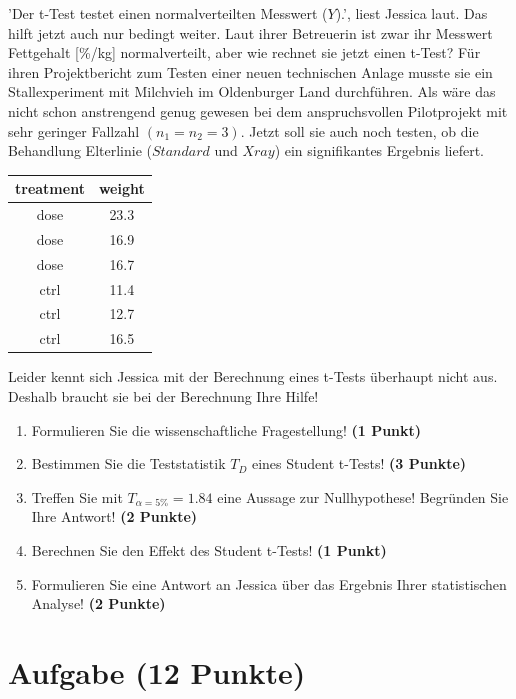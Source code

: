 \documentclass[a4paper, 9pt]{scrartcl}\usepackage[]{graphicx}\usepackage[]{xcolor}
\begin{document}
'Der t-Test testet einen normalverteilten Messwert ($Y$).', liest Jessica laut. Das hilft jetzt auch nur bedingt weiter. Laut ihrer Betreuerin ist zwar ihr Messwert Fettgehalt [\%/kg] normalverteilt, aber wie rechnet sie jetzt einen t-Test? Für ihren Projektbericht zum Testen einer neuen technischen Anlage musste sie ein Stallexperiment mit Milchvieh im Oldenburger Land durchführen. Als wäre das nicht schon anstrengend genug gewesen bei dem anspruchsvollen Pilotprojekt mit sehr geringer Fallzahl $(n_1 = n_2 = 3)$. Jetzt soll sie auch noch testen, ob die Behandlung Elterlinie ($Standard$ und $Xray$) ein signifikantes Ergebnis liefert.

\begin{table}[!h]
\centering
\begin{tabular}{cc}
\toprule
treatment & weight\\
\midrule
dose & 23.3\\
dose & 16.9\\
dose & 16.7\\
ctrl & 11.4\\
ctrl & 12.7\\
\addlinespace
ctrl & 16.5\\
\bottomrule
\end{tabular}
\end{table}



Leider kennt sich Jessica mit der Berechnung eines t-Tests überhaupt nicht aus. Deshalb braucht sie bei der Berechnung Ihre Hilfe!

\begin{enumerate}
  \item Formulieren Sie die wissenschaftliche Fragestellung! \textbf{(1 Punkt)}
  \item Bestimmen Sie die Teststatistik $T_{D}$ eines Student t-Tests! \textbf{(3 Punkte)}
  \item Treffen Sie mit $T_{\alpha = 5\%} = 1.84$ eine Aussage zur Nullhypothese! Begründen Sie Ihre Antwort! \textbf{(2 Punkte)}
  \item Berechnen Sie den Effekt des Student t-Tests! \textbf{(1 Punkt)}
  \item Formulieren Sie eine Antwort an Jessica über das Ergebnis Ihrer statistischen Analyse! \textbf{(2 Punkte)}
\end{enumerate} 
\clearpage

\section{Aufgabe \hfill (12 Punkte)}
\end{document}

